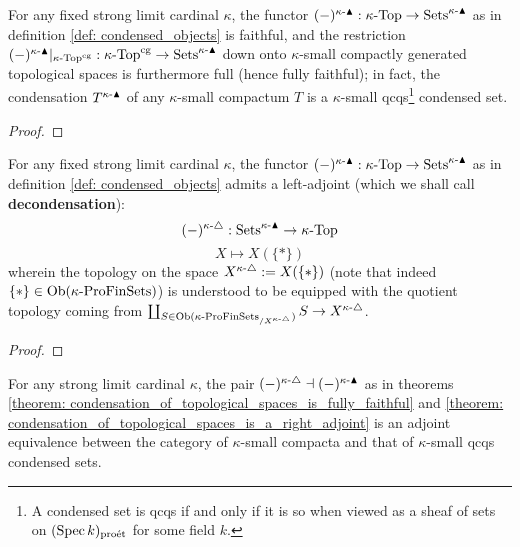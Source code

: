             \begin{theorem} \label{theorem: condensation_of_topological_spaces_is_fully_faithful}
                For any fixed strong limit cardinal $\kappa$, the functor $(-)^{\kappa\text{-}\blacktriangle}: \kappa\text{-}\mathrm{Top} \to \mathrm{Sets}^{\kappa\text{-}\blacktriangle}$ as in definition \ref{def: condensed_objects} is faithful, and the restriction $(-)^{\kappa\text{-}\blacktriangle}|_{\kappa\text{-}\mathrm{Top}^{\mathrm{cg}}}: \kappa\text{-}\mathrm{Top}^{\mathrm{cg}} \to \mathrm{Sets}^{\kappa\text{-}\blacktriangle}$ down onto $\kappa$-small compactly generated topological spaces is furthermore full (hence fully faithful); in fact, the condensation $T^{\kappa\text{-}\blacktriangle}$ of any $\kappa$-small compactum $T$ is a $\kappa$-small qcqs\footnote{A condensed set is qcqs if and only if it is so when viewed as a sheaf of sets on $(\operatorname{Spec} k)_{\mathrm{pro\acute{e}t}}$ for some field $k$.} condensed set.
            \end{theorem}
                \begin{proof}
                    
                \end{proof}
            \begin{theorem} \label{theorem: condensation_of_topological_spaces_is_a_right_adjoint}
                For any fixed strong limit cardinal $\kappa$, the functor $(-)^{\kappa\text{-}\blacktriangle}: \kappa\text{-}\mathrm{Top} \to \mathrm{Sets}^{\kappa\text{-}\blacktriangle}$ as in definition \ref{def: condensed_objects} admits a left-adjoint (which we shall call \textbf{decondensation}):
                    $$(-)^{\kappa\text{-}\triangle}: \mathrm{Sets}^{\kappa\text{-}\blacktriangle} \to \kappa\text{-}\mathrm{Top}$$
                    $$X \mapsto X(\{*\})$$
                wherein the topology on the space $X^{\kappa\text{-}\triangle} := X(\{*\})$ (note that indeed $\{*\} \in \mathrm{Ob}(\kappa\text{-}\mathrm{Pro}\mathrm{Fin}\mathrm{Sets})$) is understood to be equipped with the quotient topology coming from $\coprod_{S \in \mathrm{Ob}(\kappa\text{-}\mathrm{Pro}\mathrm{Fin}\mathrm{Sets}_{/X^{\kappa\text{-}\triangle}})} S \to X^{\kappa\text{-}\triangle}$.
            \end{theorem}
                \begin{proof}
                    
                \end{proof}
            \begin{corollary}
                For any strong limit cardinal $\kappa$, the pair $(-)^{\kappa\text{-}\triangle} \dashv (-)^{\kappa\text{-}\blacktriangle}$ as in theorems \ref{theorem: condensation_of_topological_spaces_is_fully_faithful} and \ref{theorem: condensation_of_topological_spaces_is_a_right_adjoint} is an adjoint equivalence between the category of $\kappa$-small compacta and that of $\kappa$-small qcqs condensed sets.  
            \end{corollary}
                
